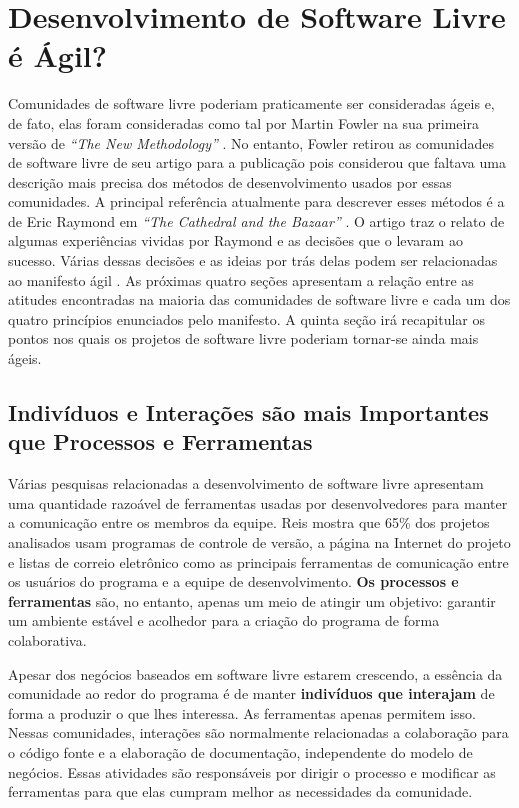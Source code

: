 \chapter{Desenvolvimento de Software Livre é Ágil?}
\label{cap:foss}

Comunidades de software livre poderiam praticamente ser consideradas
ágeis e, de fato, elas foram consideradas como tal por Martin Fowler
na sua primeira versão de \emph{``The New Methodology''}
\cite{Fowler00orig}. No entanto, Fowler retirou as comunidades de
software livre de seu artigo para a publicação pois considerou que
faltava uma descrição mais precisa dos métodos de desenvolvimento
usados por essas comunidades. A principal referência atualmente para
descrever esses métodos é a de Eric Raymond em \emph{``The Cathedral
  and the Bazaar''} \cite{Raymond1999}. O artigo traz o relato de
algumas experiências vividas por Raymond e as decisões que o levaram
ao sucesso. Várias dessas decisões e as ideias por trás delas podem
ser relacionadas ao manifesto ágil \cite{AgileManifesto}. As próximas
quatro seções apresentam a relação entre as atitudes encontradas na
maioria das comunidades de software livre e cada um dos quatro
princípios enunciados pelo manifesto. A quinta seção irá recapitular
os pontos nos quais os projetos de software livre poderiam tornar-se
ainda mais ágeis.

\section{Indivíduos e Interações são mais Importantes que Processos e
  Ferramentas}
\label{sec:first-princ}

Várias pesquisas relacionadas a desenvolvimento de software livre
apresentam uma quantidade razoável de ferramentas usadas por
desenvolvedores para manter a comunicação entre os membros da
equipe. Reis \cite{Reis2003} mostra que 65\% dos projetos analisados
usam programas de controle de versão, a página na Internet do projeto
e listas de correio eletrônico como as principais ferramentas de
comunicação entre os usuários do programa e a equipe de
desenvolvimento. \textbf{Os processos e ferramentas} são, no entanto,
apenas um meio de atingir um objetivo: garantir um ambiente estável e
acolhedor para a criação do programa de forma colaborativa.

Apesar dos negócios baseados em software livre estarem crescendo, a
essência da comunidade ao redor do programa é de manter
\textbf{indivíduos que interajam} de forma a produzir o que lhes
interessa. As ferramentas apenas permitem isso. Nessas comunidades,
interações são normalmente relacionadas a colaboração para o código
fonte e a elaboração de documentação, independente do modelo de
negócios. Essas atividades são responsáveis por dirigir o processo e
modificar as ferramentas para que elas cumpram melhor as necessidades
da comunidade.

